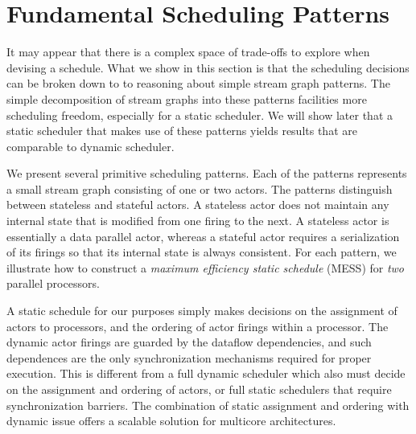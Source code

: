 \section{Fundamental Scheduling Patterns}


It may appear that there is a complex space of trade-offs to explore
when devising a schedule. What we show in this section is that the
scheduling decisions can be broken down to to reasoning about simple
stream graph patterns. The simple decomposition of stream graphs into
these patterns facilities more scheduling freedom, especially for a
static scheduler. We will show later that a static scheduler that
makes use of these patterns yields results that are comparable to
dynamic scheduler.

We present several primitive scheduling patterns. Each of the patterns
represents a small stream graph consisting of one or two actors. The
patterns distinguish between stateless and stateful actors. A
stateless actor does not maintain any internal state that is modified
from one firing to the next. A stateless actor is essentially a data
parallel actor, whereas a stateful actor requires a serialization of
its firings so that its internal state is always consistent.  For each
pattern, we illustrate how to construct a {\it maximum efficiency
static schedule} (MESS) for {\it two} parallel processors.

A static schedule for our purposes simply makes decisions on the
assignment of actors to processors, and the ordering of actor firings
within a processor. The dynamic actor firings are guarded by the
dataflow dependencies, and such dependences are the only
synchronization mechanisms required for proper execution.
This is different from a full dynamic scheduler which also must decide
on the assignment and ordering of actors, or full static schedulers
that require synchronization barriers. The combination of static
assignment and ordering with dynamic issue offers a scalable solution
for multicore architectures.

